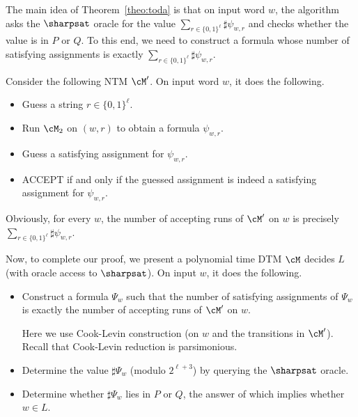 \documentclass[11pt, a4paper]{article}
\begin{document}
The main idea of Theorem~\ref{theo:toda} is that on input word $w$,
the algorithm asks the $\sharpsat$ oracle for the value $\sum_{r\in \{0,1\}^{\ell}} \sharp\psi_{w,r}$
and checks whether the value is in $P$ or $Q$.
To this end, we need to construct a formula whose number of satisfying assignments is exactly $\sum_{r\in \{0,1\}^{\ell}} \sharp\psi_{w,r}$.

Consider the following NTM $\cM'$.
On input word $w$, it does the following.
\begin{itemize}
\item
Guess a string $r\in \{0,1\}^\ell$.
\item
Run $\cM_2$ on $(w,r)$ to obtain a formula $\psi_{w,r}$.
\item
Guess a satisfying assignment for $\psi_{w,r}$.
\item
ACCEPT if and only if the guessed assignment is indeed a satisfying assignment for $\psi_{w,r}$.
\end{itemize}
Obviously, for every $w$, the number of accepting runs of $\cM'$ on $w$ is precisely $\sum_{r\in \{0,1\}^{\ell}} \sharp\psi_{w,r}$.

Now, to complete our proof, we present a polynomial time DTM $\cM$ decides $L$
(with oracle access to $\sharpsat$).
On input $w$, it does the following.
\begin{itemize}
\item
Construct a formula $\Psi_w$ such that
the number of satisfying assignments of $\Psi_w$ is exactly
the number of accepting runs of $\cM'$ on $w$.

Here we use Cook-Levin construction (on $w$ and the transitions in $\cM'$).
Recall that Cook-Levin reduction is parsimonious.
\item
Determine the value $\sharp\Psi_w$ (modulo $2^{\ell+3}$) by querying the $\sharpsat$ oracle.
\item
Determine whether $\sharp\Psi_w$ lies in $P$ or $Q$,
the answer of which implies whether $w\in L$.
\end{itemize}
\end{document}
